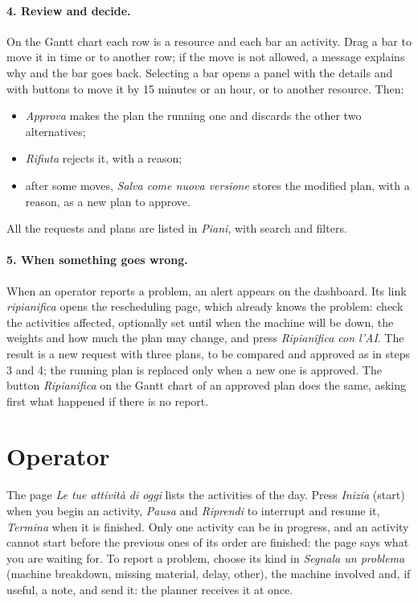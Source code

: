 \paragraph{4. Review and decide.} On the Gantt chart each row is a resource and each bar an
activity. Drag a bar to move it in time or to another row; if the move is not allowed, a message
explains why and the bar goes back. Selecting a bar opens a panel with the details and with
buttons to move it by 15 minutes or an hour, or to another resource. Then:
\begin{itemize}
  \item \emph{Approva} makes the plan the running one and discards the other two alternatives;
  \item \emph{Rifiuta} rejects it, with a reason;
  \item after some moves, \emph{Salva come nuova versione} stores the modified plan, with a
        reason, as a new plan to approve.
\end{itemize}
All the requests and plans are listed in \emph{Piani}, with search and filters.

\paragraph{5. When something goes wrong.} When an operator reports a problem, an alert appears
on the dashboard. Its link \emph{ripianifica} opens the rescheduling page, which already knows
the problem: check the activities affected, optionally set until when the machine will be down,
the weights and how much the plan may change, and press \emph{Ripianifica con l'AI}. The result
is a new request with three plans, to be compared and approved as in steps 3 and 4; the running
plan is replaced only when a new one is approved. The button \emph{Ripianifica} on the Gantt
chart of an approved plan does the same, asking first what happened if there is no report.

\section{Operator}
\label{sec:ug-operator}

The page \emph{Le tue attività di oggi} lists the activities of the day. Press \emph{Inizia}
(start) when you begin an activity, \emph{Pausa} and \emph{Riprendi} to interrupt and resume it,
\emph{Termina} when it is finished. Only one activity can be in progress, and an activity cannot
start before the previous ones of its order are finished: the page says what you are waiting for.
To report a problem, choose its kind in \emph{Segnala un problema} (machine breakdown, missing
material, delay, other), the machine involved and, if useful, a note, and send it: the planner
receives it at once.

